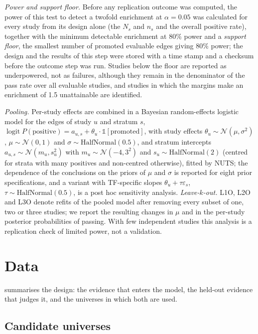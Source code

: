 \documentclass[11pt,a4paper]{article}
\begin{document}
\emph{Power and support floor.} Before any replication outcome was computed, the power of this test to detect a twofold enrichment at $\alpha=0.05$ was calculated for every study from its design alone (the $N_s$ and $n_s$ and the overall positive rate), together with the minimum detectable enrichment at 80\% power and a \emph{support floor}, the smallest number of promoted evaluable edges giving 80\% power; the design and the results of this step were stored with a time stamp and a checksum before the outcome step was run.
Studies below the floor are reported as underpowered, not as failures, although they remain in the denominator of the pass rate over all evaluable studies, and studies in which the margins make an enrichment of 1.5 unattainable are identified.

\emph{Pooling.} Per-study effects are combined in a Bayesian random-effects logistic model for the edges of study $u$ and stratum $s$, $\operatorname{logit}P(\text{positive})=a_{u,s}+\theta_u\cdot\mathbb{1}[\text{promoted}]$, with study effects $\theta_u\sim\mathcal{N}(\mu,\sigma^2)$, $\mu\sim\mathcal{N}(0,1)$ and $\sigma\sim\mathrm{HalfNormal}(0.5)$, and stratum intercepts $a_{u,s}\sim\mathcal{N}(m_u,s_u^2)$ with $m_u\sim\mathcal{N}(-4,3^2)$ and $s_u\sim\mathrm{HalfNormal}(2)$ (centred for strata with many positives and non-centred otherwise), fitted by NUTS; the dependence of the conclusions on the priors of $\mu$ and $\sigma$ is reported for eight prior specifications, and a variant with TF-specific slopes $\theta_u+\tau\varepsilon_s$, $\tau\sim\mathrm{HalfNormal}(0.5)$, is a post hoc sensitivity analysis.
\emph{Leave-$k$-out.} L1O, L2O and L3O denote refits of the pooled model after removing every subset of one, two or three studies; we report the resulting changes in $\mu$ and in the per-study posterior probabilities of passing.
With few independent studies this analysis is a replication check of limited power, not a validation.
\section{Data}\label{sec:data}

 summarises the design: the evidence that enters the model, the held-out evidence that judges it, and the universes in which both are used.

\subsection{Candidate universes}\label{sec:data-universes}
\end{document}
